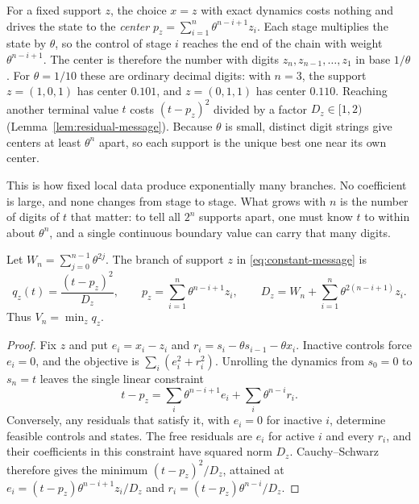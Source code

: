 For a fixed support $z$, the choice $x=z$ with exact dynamics costs
nothing and drives the state to the \emph{center}
$p_z=\sum_{i=1}^n\theta^{n-i+1}z_i$. Each stage multiplies the state by
$\theta$, so the control of stage $i$ reaches the end of the chain with
weight $\theta^{n-i+1}$. The center is therefore the number with digits
$z_n,z_{n-1},\ldots,z_1$ in base $1/\theta$. For $\theta=1/10$ these
are ordinary decimal digits: with $n=3$, the support $z=(1,0,1)$ has
center $0.101$, and $z=(0,1,1)$ has center $0.110$. Reaching another
terminal value $t$ costs $(t-p_z)^2$ divided by a factor $D_z\in[1,2)$
(Lemma~\ref{lem:residual-message}). Because $\theta$ is small, distinct
digit strings give centers at least $\theta^n$ apart, so each support
is the unique best one near its own center.

This is how fixed local data produce exponentially many branches. No
coefficient is large, and none changes from stage to stage. What grows
with $n$ is the number of digits of $t$ that matter: to tell all $2^n$
supports apart, one must know $t$ to within about $\theta^n$, and a
single continuous boundary value can carry that many digits.

\begin{lemma}\label{lem:residual-message}
Let $W_n=\sum_{j=0}^{n-1}\theta^{2j}$. The branch of support $z$ in
\eqref{eq:constant-message} is
\begin{equation}\label{eq:constant-branches}
 q_z(t)=\frac{(t-p_z)^2}{D_z},\qquad
 p_z=\sum_{i=1}^n\theta^{n-i+1}z_i,\qquad
 D_z=W_n+\sum_{i=1}^n\theta^{2(n-i+1)}z_i.
\end{equation}
Thus $V_n=\min_z q_z$.
\end{lemma}
\begin{proof}
Fix $z$ and put $e_i=x_i-z_i$ and
$r_i=s_i-\theta s_{i-1}-\theta x_i$. Inactive controls force $e_i=0$,
and the objective is $\sum_i(e_i^2+r_i^2)$. Unrolling the dynamics from
$s_0=0$ to $s_n=t$ leaves the single linear constraint
\[
 t-p_z=\sum_i\theta^{n-i+1}e_i+\sum_i\theta^{n-i}r_i.
\]
Conversely, any residuals that satisfy it, with $e_i=0$ for inactive
$i$, determine feasible controls and states. The free residuals are
$e_i$ for active $i$ and every $r_i$, and their coefficients in this
constraint have squared norm $D_z$. Cauchy--Schwarz therefore gives the
minimum $(t-p_z)^2/D_z$, attained at
$e_i=(t-p_z)\theta^{n-i+1}z_i/D_z$ and
$r_i=(t-p_z)\theta^{n-i}/D_z$.
\end{proof}

